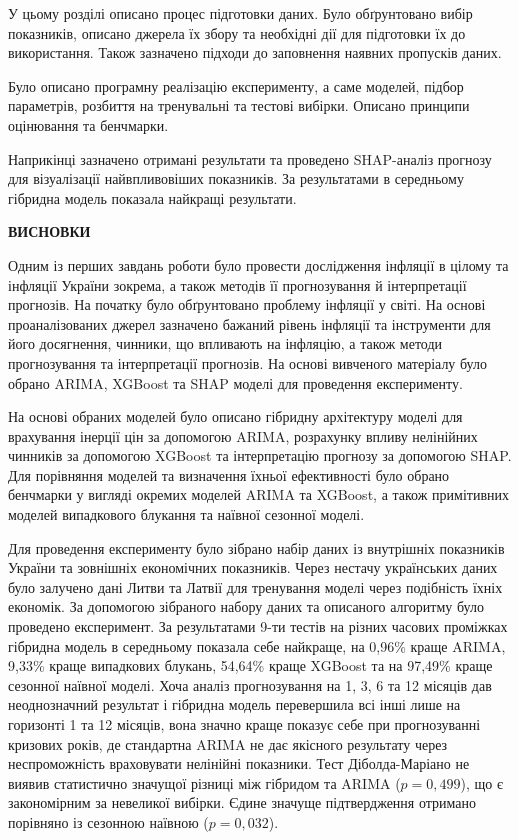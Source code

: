 \documentclass{bachelor_thesis}
\begin{document}
У цьому розділі описано процес підготовки даних. Було обґрунтовано вибір показників, описано джерела їх збору та необхідні дії для підготовки їх до використання. Також зазначено підходи до заповнення наявних пропусків даних.

Було описано програмну реалізацію експерименту, а саме моделей, підбор параметрів, розбиття на тренувальні та тестові вибірки. Описано принципи оцінювання та бенчмарки.

Наприкінці зазначено отримані результати та проведено SHAP-аналіз прогнозу для візуалізації найвпливовіших показників. За результатами в середньому гібридна модель показала найкращі результати.

\newpage
\thispagestyle{plain}
\doublespacing
{}

\begin{center}
    {\bfseries\Large\MakeUppercase{Висновки}}
\end{center}

\vspace{14pt}

Одним із перших завдань роботи було провести дослідження інфляції в цілому та інфляції України зокрема, а також методів її прогнозування й інтерпретації прогнозів. На початку було обґрунтовано проблему інфляції у світі. На основі проаналізованих джерел зазначено бажаний рівень інфляції та інструменти для його досягнення, чинники, що впливають на інфляцію, а також методи прогнозування та інтерпретації прогнозів. На основі вивченого матеріалу було обрано ARIMA, XGBoost та SHAP моделі для проведення експерименту.

На основі обраних моделей було описано гібридну архітектуру моделі для врахування інерції цін за допомогою ARIMA, розрахунку впливу нелінійних чинників за допомогою XGBoost та інтерпретацію прогнозу за допомогою SHAP. Для порівняння моделей та визначення їхньої ефективності було обрано бенчмарки у вигляді окремих моделей ARIMA та XGBoost, а також примітивних моделей випадкового блукання та наївної сезонної моделі.

Для проведення експерименту було зібрано набір даних із внутрішніх показників України та зовнішніх економічних показників. Через нестачу українських даних було залучено дані Литви та Латвії для тренування моделі через подібність їхніх економік. За допомогою зібраного набору даних та описаного алгоритму було проведено експеримент. За результатами 9-ти тестів на різних часових проміжках гібридна модель в середньому показала себе найкраще, на 0{,}96\% краще ARIMA, 9{,}33\% краще випадкових блукань, 54{,}64\% краще XGBoost та на 97{,}49\% краще сезонної наївної моделі. Хоча аналіз прогнозування на 1, 3, 6 та 12 місяців дав неоднозначний результат і гібридна модель перевершила всі інші лише на горизонті 1 та 12 місяців, вона значно краще показує себе при прогнозуванні кризових років, де стандартна ARIMA не дає якісного результату через неспроможність враховувати нелінійні показники. Тест Діболда-Маріано не виявив статистично значущої різниці між гібридом та ARIMA ($p=0{,}499$), що є закономірним за невеликої вибірки. Єдине значуще підтвердження отримано порівняно із сезонною наївною ($p=0{,}032$).
\end{document}
